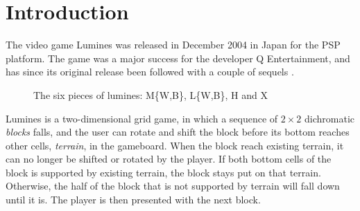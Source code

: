 \section{Introduction}

The video game Lumines was released in December 2004 in Japan for the PSP platform. The game was a major success for the developer Q Entertainment, and has since its original release been followed with a couple of sequels \cite{wiki:lumines}.

\begin{figure}[H]
    \centering
    \caption{The six pieces of lumines: M\{W,B\}, L\{W,B\}, H and X}
    \label{fig:pieces}
\end{figure}

Lumines is a two-dimensional grid game, in which a sequence of $2 \times 2$ dichromatic \textit{blocks} falls, and the user can rotate and shift the block before its bottom  reaches other cells, \textit{terrain}, in the gameboard. When the block reach existing terrain, it can no longer be shifted or rotated by the player. If both bottom cells of the block is supported by existing terrain, the block stays put on that terrain. Otherwise, the half of the block that is not supported by terrain will fall down until it is. The player is then presented with the next block.

